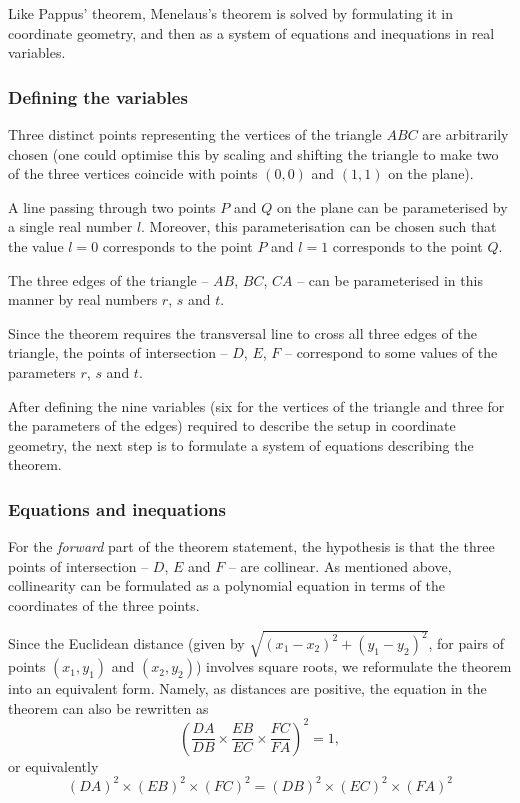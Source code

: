\documentclass{amsart}
\theoremstyle{plain}
\theoremstyle{definition}
\theoremstyle{remark}
\begin{document}
Like Pappus' theorem, Menelaus's theorem is solved by formulating it in coordinate geometry, and then as a system of equations and inequations in real variables.

\subsubsection{Defining the variables}

Three distinct points representing the vertices of the triangle \(ABC\) are arbitrarily chosen (one could optimise this by scaling and shifting the triangle to make two of the three vertices coincide with points \((0, 0)\) and \((1, 1)\) on the plane).

A line passing through two points \(P\) and \(Q\) on the plane can be parameterised by a single real number \(l\). Moreover, this parameterisation can be chosen such that the value \(l = 0\) corresponds to the point \(P\) and \(l = 1\) corresponds to the point \(Q\).

The three edges of the triangle -- \(AB\), \(BC\), \(CA\) -- can be parameterised in this manner by real numbers \(r\), \(s\) and \(t\).

Since the theorem requires the transversal line to cross all three edges of the triangle, the points of intersection -- \(D\), \(E\), \(F\) -- correspond to some values of the parameters \(r\), \(s\) and \(t\).

After defining the nine variables (six for the vertices of the triangle and three for the parameters of the edges) required to describe the setup in coordinate geometry, the next step is to formulate a system of equations describing the theorem.

\subsubsection{Equations and inequations}

For the \emph{forward} part of the theorem statement, the hypothesis is that the three points of intersection -- \(D\), \(E\) and \(F\) -- are collinear. As mentioned above, collinearity can be formulated as a polynomial equation in terms of the coordinates of the three points.

Since the Euclidean distance (given by $\sqrt{(x_1 - x_2)^2 + (y_1 - y_2)^2}$, for pairs of points $(x_1, y_1)$ and $(x_2, y_2)$) involves square roots, we reformulate the theorem into an equivalent form. Namely, as distances are positive, the equation in the theorem can also be rewritten as
$$\left(\frac{DA}{DB} \times \frac{EB}{EC} \times \frac{FC}{FA}\right)^2 = 1,$$
or equivalently
$$
	(DA)^2 \times (EB)^2 \times (FC)^2 = (DB)^2 \times (EC)^2 \times (FA)^2
$$
\end{document}
